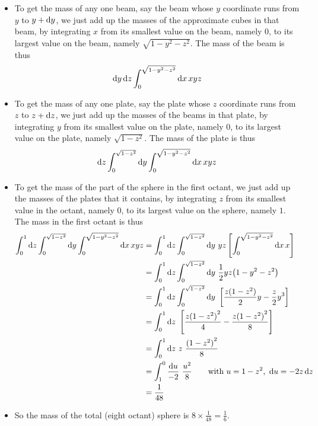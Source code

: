 \begin{eg}
\begin{itemize}
\item
To get the mass of any one beam, say the beam whose $y$ coordinate runs 
from $y$ to $y+\mathrm{d}y$, we just add up the masses of the approximate 
cubes in that beam, by integrating $x$ from its smallest value on 
the beam, namely $0$, to its largest value on the beam, namely 
$\sqrt{1-y^2-z^2}$. The mass of the beam is thus
\begin{align*}
\mathrm{d}y\,\mathrm{d}z \int_0^{\sqrt{1-y^2-z^2}}  \mathrm{d}x\,xyz
\end{align*}

\item
To get the mass of any one plate, say the plate whose $z$ coordinate runs 
from $z$ to $z+\mathrm{d}z$, we just add up the masses of the beams 
in that plate, by integrating $y$ from its smallest value on 
the plate, namely $0$, to its largest value on the plate, namely 
$\sqrt{1-z^2}$. The mass of the plate is thus
\begin{align*}
\mathrm{d}z\int_0^{\sqrt{1-z^2}}\mathrm{d}y\int_0^{\sqrt{1-y^2-z^2}}  \mathrm{d}x\,xyz
\end{align*}

\item
To get the mass of the part of the sphere in the first octant, we just 
add up the masses of the plates that it contains, by integrating $z$ from its smallest value in the octant, namely $0$, to its largest value on the sphere, 
namely  $1$. The mass in the first octant is thus
\begin{align*}
\int_0^1\dee{z}\int_0^{\sqrt{1-z^2}}\dee{y}\int_0^{\sqrt{1-y^2-z^2}}  \dee{x}\,xyz
&= \int_0^1\dee{z}\int_0^{\sqrt{1-z^2}}\dee{y}\ yz
          \left[\int_0^{\sqrt{1-y^2-z^2}}  \dee{x}\,x\right] \\
&= \int_0^1\dee{z}\int_0^{\sqrt{1-z^2}}\dee{y}\ 
              \frac{1}{2}yz \big(1-y^2-z^2\big) \\
&=\int_0^1\dee{z}\int_0^{\sqrt{1-z^2}}\dee{y}\ 
                      \left[\frac{z(1-z^2)}{2}y-\frac{z}{2}y^3\right] \\
&=\int_0^1\dee{z}\ \left[\frac{z{(1-z^2)}^2}{4}-\frac{z{(1-z^2)}^2}{8}\right] \\
&=\int_0^1\dee{z}\ z\ \frac{{(1-z^2)}^2}{8} \\
&=\int_1^0\frac{\dee{u}}{-2}\ \frac{u^2}{8}
           \qquad\text{with }u=1-z^2,\ \dee{u}=-2z\,\dee{z} \\
&=\frac{1}{48}
\end{align*}
\item
So the mass of the total (eight octant) sphere is $8\times\frac{1}{48}=\frac{1}{6}$.
\end{itemize}

\end{eg}

